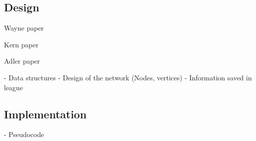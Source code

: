 \subsection{Design}

Wayne paper~\cite{Wayne}

Kern paper~\cite{Kern}

Adler paper~\cite{Adler}

- Data structures 
- Design of the network (Nodes, vertices)
- Information saved in league

\subsection{Implementation}

- Pseudocode
